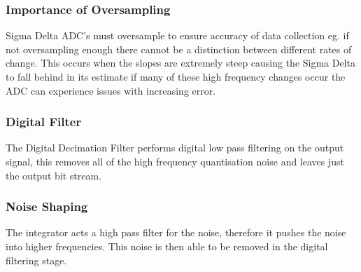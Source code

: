 

\subsubsection{Importance of Oversampling}
Sigma Delta ADC's must oversample to ensure accuracy of data collection eg. if not oversampling
enough there cannot be a distinction between different rates of change. This occurs when the slopes
are extremely steep causing the Sigma Delta to fall behind in its estimate if many of these high
frequency changes occur the ADC can experience issues with increasing error.

\subsubsection{Digital Filter}
The Digital Decimation Filter performs digital low pass filtering on the output signal, this removes
all of the high frequency quantisation noise and leaves just the output bit stream.

\subsubsection{Noise Shaping}
The integrator acts a high pass filter for the noise, therefore it pushes the noise into higher
frequencies. This noise is then able to be removed in the digital filtering stage.
